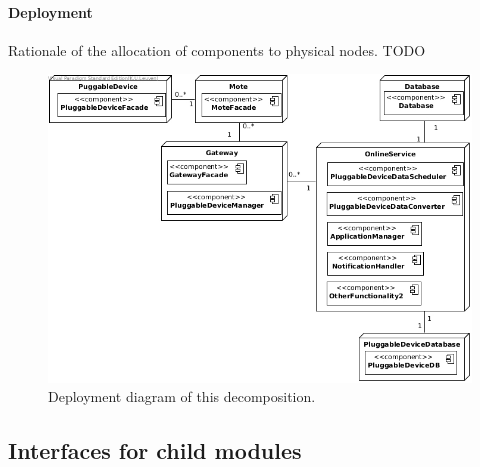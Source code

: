
    \paragraph{Deployment}
        Rationale of the allocation of components to physical nodes.
        TODO

        \begin{figure}[!htp]
        	\centering
        	\includegraphics[width=1.00\textwidth]{deployment-diagram-2}
        	\caption{Deployment diagram of this decomposition.
        	}\label{fig:it1-depl_main}
        \end{figure}


\subsection{Interfaces for child modules}

